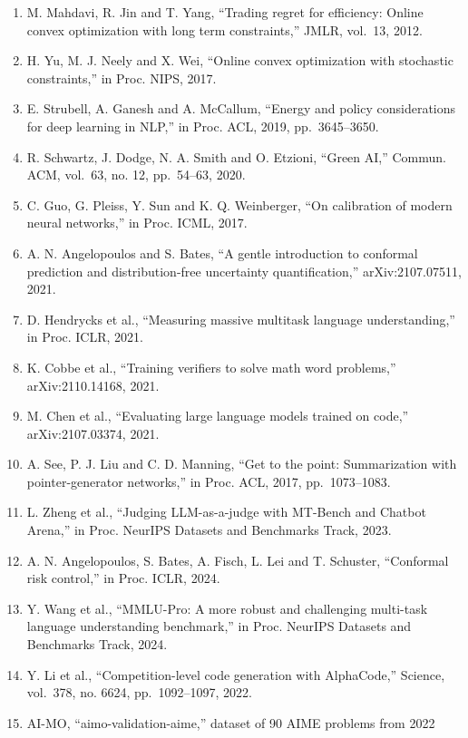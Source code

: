 \documentclass[
  10pt,
]{article}
\begin{document}
\begin{enumerate}
  knapsacks,'' in Proc. IEEE FOCS, 2013, pp.~207--216.
\item
  M. Mahdavi, R. Jin and T. Yang, ``Trading regret for efficiency:
  Online convex optimization with long term constraints,'' JMLR,
  vol.~13, 2012.
\item
  H. Yu, M. J. Neely and X. Wei, ``Online convex optimization with
  stochastic constraints,'' in Proc. NIPS, 2017.
\item
  E. Strubell, A. Ganesh and A. McCallum, ``Energy and policy
  considerations for deep learning in NLP,'' in Proc. ACL, 2019,
  pp.~3645--3650.
\item
  R. Schwartz, J. Dodge, N. A. Smith and O. Etzioni, ``Green AI,''
  Commun. ACM, vol.~63, no. 12, pp.~54--63, 2020.
\item
  C. Guo, G. Pleiss, Y. Sun and K. Q. Weinberger, ``On calibration of
  modern neural networks,'' in Proc. ICML, 2017.
\item
  A. N. Angelopoulos and S. Bates, ``A gentle introduction to conformal
  prediction and distribution-free uncertainty quantification,''
  arXiv:2107.07511, 2021.
\item
  D. Hendrycks et al., ``Measuring massive multitask language
  understanding,'' in Proc. ICLR, 2021.
\item
  K. Cobbe et al., ``Training verifiers to solve math word problems,''
  arXiv:2110.14168, 2021.
\item
  M. Chen et al., ``Evaluating large language models trained on code,''
  arXiv:2107.03374, 2021.
\item
  A. See, P. J. Liu and C. D. Manning, ``Get to the point: Summarization
  with pointer-generator networks,'' in Proc. ACL, 2017, pp.~1073--1083.
\item
  L. Zheng et al., ``Judging LLM-as-a-judge with MT-Bench and Chatbot
  Arena,'' in Proc. NeurIPS Datasets and Benchmarks Track, 2023.
\item
  A. N. Angelopoulos, S. Bates, A. Fisch, L. Lei and T. Schuster,
  ``Conformal risk control,'' in Proc. ICLR, 2024.
\item
  Y. Wang et al., ``MMLU-Pro: A more robust and challenging multi-task
  language understanding benchmark,'' in Proc. NeurIPS Datasets and
  Benchmarks Track, 2024.
\item
  Y. Li et al., ``Competition-level code generation with AlphaCode,''
  Science, vol.~378, no. 6624, pp.~1092--1097, 2022.
\item
  AI-MO, ``aimo-validation-aime,'' dataset of 90 AIME problems from 2022

\end{enumerate}
\end{document}
